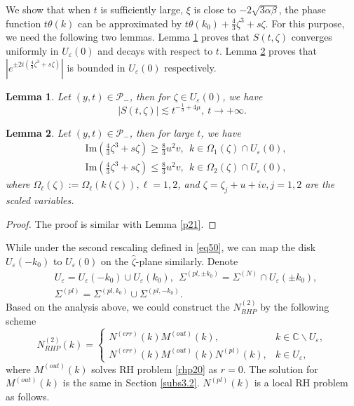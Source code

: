 \documentclass[11pt]{article}
\numberwithin{equation}{section}
\newtheorem{lemma}{Lemma}
\begin{document}
We show   that when $t$ is sufficiently large, $\xi$ is close  to $-2\sqrt{3\alpha\beta}$, the phase function $ t \theta(k)$ can be  approximated by $ t\theta(k_0)+\frac{4}{3} \zeta^3 + s \zeta $.
For this purpose,  we need the following two lemmas. Lemma \ref{l7} proves that   $S(t,\zeta)$ converges uniformly in  $U_{\varepsilon}(0)$ and  decays  with respect to  $t$. Lemma \ref{l8} proves that $ \left| e^{ \pm 2 i  (\frac{4}{3} \zeta^3 + s\zeta  )} \right|$ is bounded in  $U_\varepsilon(0)$ respectively.

\begin{lemma}\label{l7}
     Let  $(y,t)\in  \mathcal{P}_{-}$,   then for  $\zeta\in U_\varepsilon(0)$, we have
$$| S(t,\zeta)| \lesssim   t^{-\frac{1}{3}+4\mu},  \ t\to +\infty. $$
\end{lemma}

\begin{lemma}\label{l8}
    Let   $(y,t)\in \mathcal{P}_{-}$, then for  large $t$, we have
\begin{align}
  &\mathrm{Im} \left(\frac{4}{3} \zeta^3 + s\zeta \right) \geqslant \frac{8}{3}u^2v, \ \  k\in \Omega_1(\zeta)\cap U_\varepsilon(0),\\
  &\mathrm{Im} \left(\frac{4}{3} \zeta^3 + s\zeta \right) \leqslant \frac{8}{3}u^2v,\ \   k\in \Omega_2(\zeta)\cap U_\varepsilon(0),
\end{align}
where  $ \Omega_{\ell}(\zeta):=\Omega_{\ell}(k(\zeta)),\ell=1,2$, and $\zeta=\zeta_j+u+iv,j=1,2$ are the scaled variables.
\end{lemma}
\begin{proof}
    The proof is similar with Lemma \ref{p21}.
\end{proof}
While under the second rescaling defined in \eqref{eq50}, we can map the disk  $U_{\varepsilon}(-k_0)$ to  $U_{\varepsilon}(0)$ on the $\hat \zeta$-plane similarly. Denote
\begin{align*}
    &U_{\varepsilon}=U_{\varepsilon}(-k_0)\cup U_{\varepsilon}(k_0),\ \
    \Sigma^{(pl,\pm k_0)}=\Sigma^{(N)}\cap U_{\varepsilon}(\pm k_0),\\
    &\Sigma^{(pl)}=\Sigma^{(pl, k_0)}\cup\Sigma^{(pl,- k_0)}.
\end{align*}
Based on the analysis above, we could construct the $N^{(2)}_{RHP}$ by the following scheme
\begin{equation}\label{eq62}
    N_{R H P}^{(2)}(k)= \begin{cases}N^{(err)}(k)M^{(out)}(k), & k \in \mathbb{C} \backslash U_{\varepsilon}, \\ N^{(err)}(k)M^{(out)}(k) N^{(pl)}\left(k\right), & k \in U_{\varepsilon},\end{cases}
\end{equation}
where $M^{(out)}(k)$ solves RH problem \ref{rhp20} as $r=0$. The solution for $M^{(out)}(k)$ is the same in Section \ref{subs3.2}.  $N^{(pl)}\left(k\right)$ is a local RH problem as follows.
\end{document}
